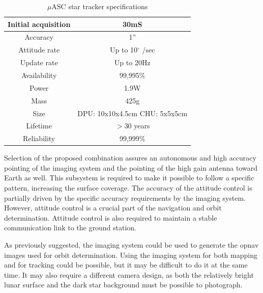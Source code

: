 \begin{table}[htb!]
  \centering
    \begin{tabular}{|r|c|}
    \hline
    Initial acquisition & 30mS \bigstrut\\
    \hline
    \multicolumn{1}{|c|}{Accuracy} & 1” \bigstrut\\
    \hline
    \multicolumn{1}{|c|}{Attitude rate} & Up to 10$^{\circ}$ /sec \bigstrut\\
    \hline
    \multicolumn{1}{|c|}{Update rate} & Up to 20Hz \bigstrut\\
    \hline
    \multicolumn{1}{|c|}{Availability} & 99,995\% \bigstrut\\
    \hline
    \multicolumn{1}{|c|}{Power} & 1.9W \bigstrut\\
    \hline
    \multicolumn{1}{|c|}{Mass} & 425g \bigstrut\\
    \hline
    \multicolumn{1}{|c|}{Size} & DPU: 10x10x4.5cm CHU: 5x5x5cm \bigstrut\\
    \hline
    \multicolumn{1}{|c|}{Lifetime} & $>$30 years \bigstrut\\
    \hline
    \multicolumn{1}{|c|}{Reliability} & 99,999\% \bigstrut\\
    \hline
    \end{tabular}%
    \caption{$\mu$ASC star tracker specifications \cite {masc}}
  \label{tab:masc}%
\end{table}%
Selection of the proposed combination assures an autonomous and high accuracy pointing of the imaging system and the pointing of the high gain antenna toward Earth as well. 
This subsystem is required to make it possible to follow a specific pattern, increasing the surface coverage. The accuracy of the attitude control is partially driven by the specific accuracy requirements by the imaging system. However, attitude control is a crucial part of the navigation and orbit determination. Attitude control is also required to maintain a stable communication link to the ground station. 

As previously suggested, the imaging system could be used to generate the opnav images used for orbit determination. Using the imaging system for both mapping and for tracking could be possible, but it may be difficult to do it at the same time. It may also require a different camera design, as both the relatively bright lunar surface and the dark star background must be possible to photograph.

